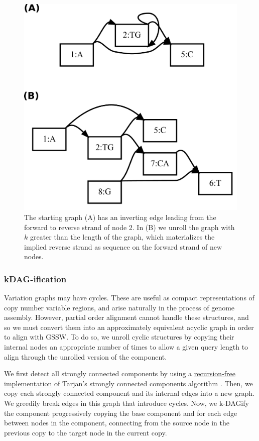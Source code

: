 \documentclass{article}
\begin{document}
\begin{figure}[t]
\centering
\includegraphics[width=1.0\textwidth]{figures/unfold}
\caption{\label{fig:unfold}
  The starting graph (A) has an inverting edge leading from the forward to reverse strand of node 2.
  In (B) we unroll the graph with $k$ greater than the length of the graph, which materializes the implied reverse strand as sequence on the forward strand of new nodes.
}
\end{figure}

\subsubsection{kDAG-ification}

Variation graphs may have cycles.
These are useful as compact representations of copy number variable regions, and arise naturally in the process of genome assembly.
However, partial order alignment cannot handle these structures, and so we must convert them into an approximately equivalent acyclic graph in order to align with GSSW.
To do so, we unroll cyclic structures by copying their internal nodes an appropriate number of times to allow a given query length to align through the unrolled version of the component.

We first detect all strongly connected components by using a \href{https://github.com/vgteam/vg/blob/fbcb6e62/src/vg.cpp#L3508-L3552}{recursion-free implementation} of Tarjan's strongly connected components algorithm \cite{tarjan1972depth}.
Then, we copy each strongly connected component and its internal edges into a new graph.
We greedily break edges in this graph that introduce cycles.
Now, we k-DAGify the component progressively copying the base component and for each edge between nodes in the component, connecting from the source node in the previous copy to the target node in the current copy.
\end{document}
